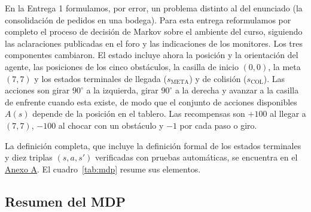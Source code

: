\documentclass[11pt,letterpaper]{article}
\newcommand{\META}{s_{\mathrm{META}}}
\newcommand{\COL}{s_{\mathrm{COL}}}
\begin{document}
En la Entrega 1 formulamos, por error, un problema distinto al del enunciado (la consolidación de pedidos en una
bodega). Para esta entrega reformulamos por completo el proceso de decisión de Markov sobre el ambiente del curso,
siguiendo las aclaraciones publicadas en el foro y las indicaciones de los monitores. Los tres componentes
cambiaron. El estado incluye ahora la posición y la orientación del agente, las posiciones de los cinco
obstáculos, la casilla de inicio $(0,0)$, la meta $(7,7)$ y los estados terminales de llegada ($\META$) y de
colisión ($\COL$). Las acciones son girar $90^\circ$ a la izquierda, girar $90^\circ$ a la derecha y avanzar a la
casilla de enfrente cuando esta existe, de modo que el conjunto de acciones disponibles $A(s)$ depende de la
posición en el tablero. Las recompensas son $+100$ al llegar a $(7,7)$, $-100$ al chocar con un obstáculo y $-1$
por cada paso o giro.

La definición completa, que incluye la definición formal de los estados terminales y diez triplas $(s,a,s')$
verificadas con pruebas automáticas, se encuentra en el \hyperref[anexo]{Anexo A}. El cuadro~\ref{tab:mdp}
resume sus elementos.

\subsection{Resumen del MDP}
\end{document}
